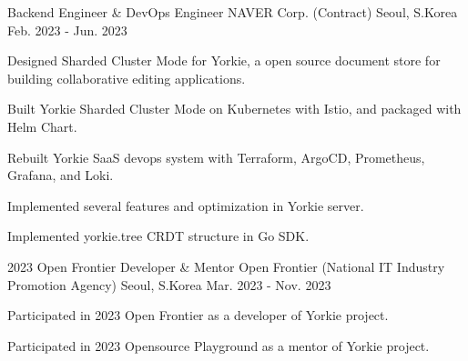 

\begin{cventries}

  \cventry
    {Backend Engineer \& DevOps Engineer} %
    {NAVER Corp. (Contract)} %
    {Seoul, S.Korea} %
    {Feb. 2023 - Jun. 2023} %
    {
      \begin{cvitems} %
        \item {Designed Sharded Cluster Mode for Yorkie, a open source document store for building collaborative editing applications.}
        \item {Built Yorkie Sharded Cluster Mode on Kubernetes with Istio, and packaged with Helm Chart.}
        \item {Rebuilt Yorkie SaaS devops system with Terraform, ArgoCD, Prometheus, Grafana, and Loki.}
        \item {Implemented several features and optimization in Yorkie server.}
        \item {Implemented yorkie.tree CRDT structure in Go SDK.}
      \end{cvitems}
    }

  \cventry
    {2023 Open Frontier Developer \& Mentor} %
    {Open Frontier (National IT Industry Promotion Agency)} %
    {Seoul, S.Korea} %
    {Mar. 2023 - Nov. 2023} %
    {
      \begin{cvitems} %
        \item {Participated in 2023 Open Frontier as a developer of Yorkie project.}
        \item {Participated in 2023 Opensource Playground as a mentor of Yorkie project.}
      \end{cvitems}
    }


\end{cventries}

